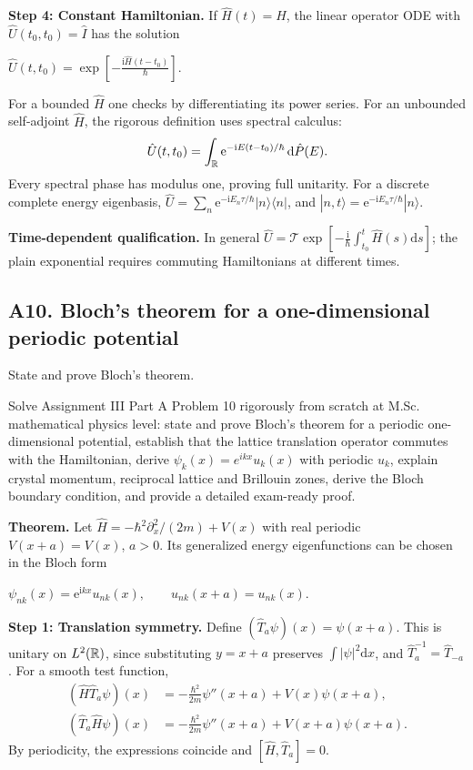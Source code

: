 \documentclass[11pt,a4paper]{article}
\newcommand{\key}[1]{\begin{resultbox}\centering\(\displaystyle #1\)\end{resultbox}}
\newcommand{\dd}{\mathrm{d}}\newcommand{\iu}{\mathrm{i}}\newcommand{\ee}{\mathrm{e}}
\newcommand{\bra}[1]{\langle #1|}\newcommand{\ket}[1]{|#1\rangle}
\begin{document}
\textbf{Step 4: Constant Hamiltonian.} If \(\hat H(t)=\hat H\), the linear operator ODE with \(\hat U(t_0,t_0)=\hat I\) has the solution
\key{\boxed{\hat U(t,t_0)=\exp\!\left[-\frac{\iu\hat H(t-t_0)}{\hbar}\right].}}
For a bounded \(\hat H\) one checks by differentiating its power series. For an unbounded self-adjoint \(\hat H\), the rigorous definition uses spectral calculus:
\begin{equation}\hat U(t,t_0)=\int_{\R}\ee^{-\iu E(t-t_0)/\hbar}\,\dd\hat P(E).\end{equation}
Every spectral phase has modulus one, proving full unitarity. For a discrete complete energy eigenbasis, \(\hat U=\sum_n\ee^{-\iu E_n\tau/\hbar}\ket n\bra n\), and \(\ket{n,t}=\ee^{-\iu E_n\tau/\hbar}\ket n\).

\textbf{Time-dependent qualification.} In general \(\hat U=\mathcal T\exp[-\frac{\iu}{\hbar}\int_{t_0}^t\hat H(s)\dd s]\); the plain exponential requires commuting Hamiltonians at different times.

\subsection{A10. Bloch's theorem for a one-dimensional periodic potential}
\begin{questionbox}
State and prove Bloch's theorem.
\end{questionbox}
\begin{studybox}
Solve Assignment III Part A Problem 10 rigorously from scratch at M.Sc. mathematical physics level: state and prove Bloch's theorem for a periodic one-dimensional potential, establish that the lattice translation operator commutes with the Hamiltonian, derive \(\psi_k(x)=e^{ikx}u_k(x)\) with periodic \(u_k\), explain crystal momentum, reciprocal lattice and Brillouin zones, derive the Bloch boundary condition, and provide a detailed exam-ready proof.
\end{studybox}
\textbf{Theorem.} Let \(\hat H=-\hbar^2\partial_x^2/(2m)+V(x)\) with real periodic \(V(x+a)=V(x)\), \(a>0\). Its generalized energy eigenfunctions can be chosen in the Bloch form
\key{\boxed{\psi_{nk}(x)=\ee^{\iu kx}u_{nk}(x),\qquad u_{nk}(x+a)=u_{nk}(x).}}
\textbf{Step 1: Translation symmetry.} Define \((\hat T_a\psi)(x)=\psi(x+a)\). This is unitary on \(L^2(\mathbb R)\), since substituting \(y=x+a\) preserves \(\int|\psi|^2\dd x\), and \(\hat T_a^{-1}=\hat T_{-a}\). For a smooth test function,
\begin{align}
(\hat H\hat T_a\psi)(x)&=-\frac{\hbar^2}{2m}\psi''(x+a)+V(x)\psi(x+a),\\
(\hat T_a\hat H\psi)(x)&=-\frac{\hbar^2}{2m}\psi''(x+a)+V(x+a)\psi(x+a).
\end{align}
By periodicity, the expressions coincide and \(\boxed{[\hat H,\hat T_a]=0}\).
\end{document}
